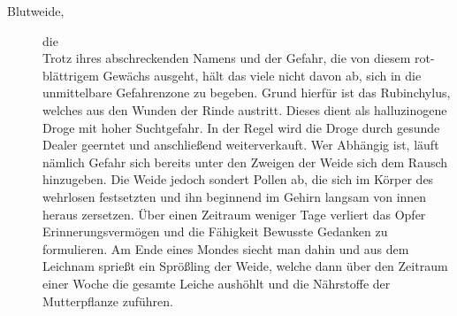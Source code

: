 \documentclass[a4paper,12pt,oneside]{book}
\begin{document}
\begin{description}
\item[Blutweide,] die
\\Trotz ihres abschreckenden Namens und der Gefahr, die von diesem rot-blättrigem Gewächs ausgeht, hält das viele nicht davon ab, sich in die unmittelbare Gefahrenzone zu begeben. Grund hierfür ist das Rubinchylus, welches aus den Wunden der Rinde austritt. Dieses dient als halluzinogene Droge mit hoher Suchtgefahr. In der Regel wird die Droge durch gesunde Dealer geerntet und anschließend weiterverkauft. Wer Abhängig ist, läuft nämlich Gefahr sich bereits unter den Zweigen der Weide sich dem Rausch hinzugeben. Die Weide jedoch sondert Pollen ab, die sich im Körper des wehrlosen festsetzten und ihn beginnend im Gehirn langsam von innen heraus zersetzen. Über einen Zeitraum weniger Tage verliert das Opfer Erinnerungsvermögen und die Fähigkeit Bewusste Gedanken zu formulieren. Am Ende eines Mondes siecht man dahin und aus dem Leichnam sprießt ein Sprößling der Weide, welche dann über den Zeitraum einer Woche die gesamte Leiche aushöhlt und die Nährstoffe der Mutterpflanze zuführen.


\end{description}
\end{document}
